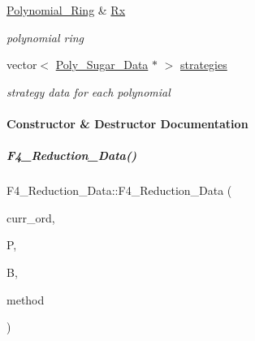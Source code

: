 \begin{DoxyCompactItemize}
\mbox{\label{group___g_b_computation_a4a1dcdff469ec1061109dc33aaceb011}} 
\hyperlink{group__polygroup_class_polynomial___ring}{Polynomial\+\_\+\+Ring} \& \hyperlink{group___g_b_computation_a4a1dcdff469ec1061109dc33aaceb011}{Rx}
\begin{DoxyCompactList}\small\item\em polynomial ring \end{DoxyCompactList}\item 
\mbox{\label{group___g_b_computation_a7536f2bbcdcfcadd45c209694c31e3a4}} 
vector$<$ \hyperlink{group__strategygroup_class_poly___sugar___data}{Poly\+\_\+\+Sugar\+\_\+\+Data} $\ast$ $>$ \hyperlink{group___g_b_computation_a7536f2bbcdcfcadd45c209694c31e3a4}{strategies}
\begin{DoxyCompactList}\small\item\em strategy data for each polynomial \end{DoxyCompactList}\end{DoxyCompactItemize}


\paragraph{Constructor \& Destructor Documentation}
\mbox{\label{group___g_b_computation_a41791d20f96fc7310a40a8e4c63aa4ef}} 
\subparagraph{\texorpdfstring{F4\+\_\+\+Reduction\+\_\+\+Data()}{F4\_Reduction\_Data()}\hspace{0.1cm}{\footnotesize\ttfamily [1/3]}}
{\footnotesize\ttfamily F4\+\_\+\+Reduction\+\_\+\+Data\+::\+F4\+\_\+\+Reduction\+\_\+\+Data (\begin{DoxyParamCaption}\item[{const \hyperlink{group__orderinggroup_class_w_grevlex}{W\+Grevlex} $\ast$}]{curr\+\_\+ord,  }\item[{const list$<$ \hyperlink{group___g_b_computation_class_critical___pair___dynamic}{Critical\+\_\+\+Pair\+\_\+\+Dynamic} $\ast$$>$ \&}]{P,  }\item[{const list$<$ \hyperlink{group__polygroup_class_abstract___polynomial}{Abstract\+\_\+\+Polynomial} $\ast$$>$ \&}]{B,  }\item[{Dynamic\+\_\+\+Heuristic}]{method }\end{DoxyParamCaption})}



